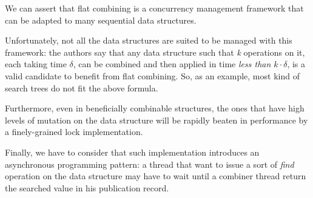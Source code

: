 We can assert that flat combining is a concurrency management framework that can be
adapted to many sequential data structures.

Unfortunately, not all the data structures are suited to be managed with this framework: the authors
say that any data structure such that \emph{k} operations on it, each taking time $\delta$, can be
combined and then applied in time \emph{less than $k \cdot \delta$}, is a valid candidate to benefit
from flat combining. So, as an example, most kind of search trees do not fit the above formula.

Furthermore, even in beneficially combinable structures, the ones that have high levels of mutation on
the data structure will be rapidly beaten in performance by a finely-grained lock implementation.

Finally, we have to consider that such implementation introduces an asynchronous programming 
pattern: a thread that want to issue a sort of \emph{find} operation on the data structure may have 
to wait until a combiner thread return the searched value in his publication record.
